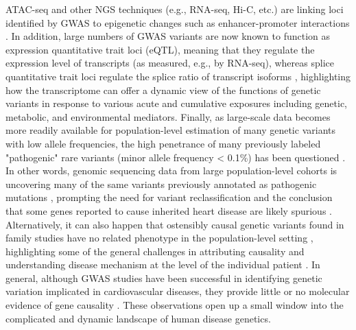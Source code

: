 \documentclass[letter]{bib}
\begin{document}
ATAC-seq and other NGS techniques (e.g., RNA-seq, Hi-C, etc.) are linking loci identified by GWAS to epigenetic changes such as enhancer-promoter interactions \citep{Lau:2018:Omics}.  In addition, large numbers of GWAS variants are now known to function as expression quantitative trait loci (eQTL), meaning that they regulate the expression level of transcripts (as measured, e.g., by RNA-seq), whereas splice quantitative trait loci regulate the splice ratio of transcript isoforms \citep{Lau:2018:Omics}, highlighting how the transcriptome can offer a dynamic view of the functions of genetic variants in response to various acute and cumulative exposures including genetic, metabolic, and environmental mediators.  Finally, as large-scale data becomes more readily available for population-level estimation of many genetic variants with low allele frequencies, the high penetrance of many previously labeled "pathogenic" rare variants (minor allele frequency < 0.1\%) has been questioned \citep{Lek:2016:Analysis}.  In other words, genomic sequencing data from large population-level cohorts is uncovering many of the same variants previously annotated as pathogenic mutations \citep{Lek:2016:Analysis,Walsh:2017:Reassessment}, prompting the need for variant reclassification and the conclusion that some genes reported to cause inherited heart disease are likely spurious \citep{Macrae:2017:Closing}. Alternatively, it can also happen that ostensibly causal genetic variants found in family studies have no related phenotype in the population-level setting \citep{Manrai:2016:Clinical}, highlighting some of the general challenges in attributing causality and understanding disease mechanism at the level of the individual patient \citep{Macrae:2017:Closing}.  In general, although GWAS studies have been successful in identifying genetic variation implicated in cardiovascular diseases, they provide little or no molecular evidence of gene causality \citep{Leon-Mimila:2019:Relevance}.  These observations open up a small window into the complicated and dynamic landscape of human disease genetics.  
\end{document}
